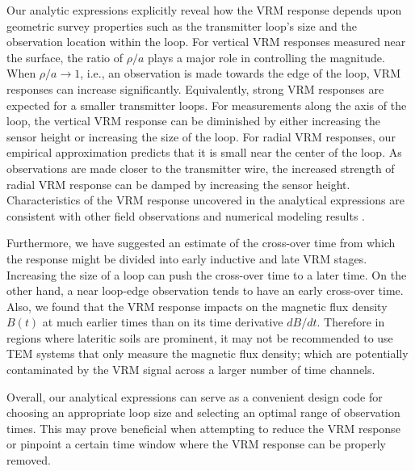 \documentclass[journal]{IEEEtran}  %
\begin{document}
Our analytic expressions explicitly reveal how the
VRM response depends upon geometric survey properties such as the transmitter
loop's size and the observation location within the loop. For
vertical VRM responses measured near the surface, the ratio of $\rho/a$ plays
a major role in controlling the magnitude. When $\rho/a \rightarrow
1$, i.e., an observation is made towards the edge of the loop, VRM
responses can increase significantly. Equivalently, strong VRM
responses are expected for a smaller transmitter loops. For
measurements along the axis of the loop, the vertical VRM response
 can be diminished by either increasing the
sensor height or increasing the size of the loop. For radial VRM
responses, our empirical approximation predicts that it is small
near the center of the loop. As observations are made closer to the
transmitter wire, the increased strength of radial VRM response can be damped
by increasing the sensor height. Characteristics of the VRM response uncovered in
the analytical expressions are
consistent with other field observations and numerical modeling
results \cite{Buselli1982, Barsukov2001, Billings2003,
Kozhevnikov2007,Pasion2007, Zadorozhnaya2012}.

Furthermore, we have suggested an estimate of the
cross-over time from which the response might be divided into early
inductive and late VRM stages. Increasing the size of a loop can
push the cross-over time to a later time. On the other hand, a near
loop-edge observation tends to have an early cross-over time. Also, we
found that the VRM response impacts on the magnetic flux density $B(t)$ at
much earlier times than on its time derivative $dB/dt$. Therefore in
regions where lateritic soils are prominent, it may not be
recommended to use TEM systems that only measure the magnetic flux
density; which are potentially contaminated by the VRM signal across a
larger number of time channels.

Overall, our analytical expressions can serve as a
convenient design code for choosing an appropriate loop size and
selecting an optimal range of observation times. This may prove beneficial when attempting to reduce the VRM
response or pinpoint a certain time window where the VRM response can be
properly removed.



\end{document}
